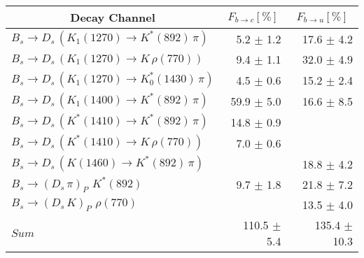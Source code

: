 \begin{tabular}{l r r } 
\hline
\hline
\multicolumn{1}{c}{Decay Channel} & \multicolumn{1}{c}{$F_{b \to c} [\%]$} & \multicolumn{1}{c}{$F_{b \to u} [\%]$}  \\ 
\hline
$B_s \to D_s \, ( K_1(1270) \to K^{*}(892) \, \pi )$ & 5.2 $\pm$ 1.2 & 17.6 $\pm$ 4.2 \\ 
$B_s \to D_s \, ( K_1(1270) \to K \, \rho(770) )$ & 9.4 $\pm$ 1.1 & 32.0 $\pm$ 4.9 \\ 
$B_s \to D_s \, ( K_1(1270) \to K^{*}_{0}(1430) \, \pi )$ & 4.5 $\pm$ 0.6 & 15.2 $\pm$ 2.4 \\ 
$B_s \to D_s \, ( K_1(1400) \to K^{*}(892) \, \pi )$ & 59.9 $\pm$ 5.0 & 16.6 $\pm$ 8.5 \\ 
$B_s \to D_s \, ( K^{*}(1410) \to K^{*}(892) \, \pi )$ & 14.8 $\pm$ 0.9 &  \\ 
$B_s \to D_s \, ( K^{*}(1410) \to K \, \rho(770) )$ & 7.0 $\pm$ 0.6 &  \\ 
$B_s \to D_s \, ( K(1460) \to K^{*}(892) \, \pi )$ &  & 18.8 $\pm$ 4.2 \\ 
$B_s \to ( D_s \, \pi)_{P} \, \, K^{*}(892)$ & 9.7 $\pm$ 1.8 & 21.8 $\pm$ 7.2 \\ 
$B_s \to ( D_s \, K)_{P} \, \, \rho(770)$ &  & 13.5 $\pm$ 4.0 \\ 
\hline
$Sum$ & 110.5 $\pm$ 5.4 & 135.4 $\pm$ 10.3 \\ 
\hline
\hline
\end{tabular}
